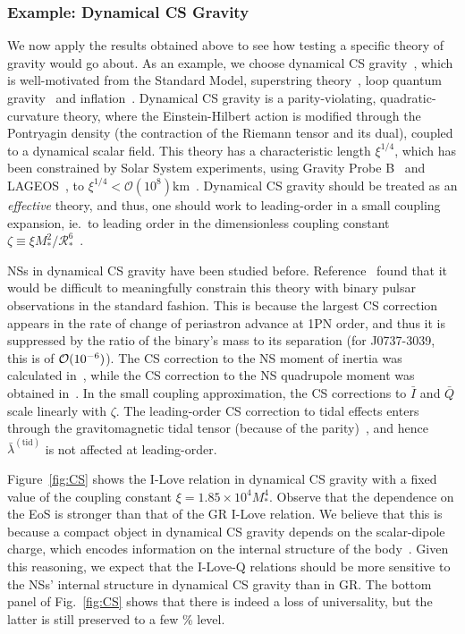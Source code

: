 \documentclass[aps,twocolumn,nofootinbib,showpacs,superscriptaddress,hyperref]{revtex4-1}
\newcommand{\NS}{*}
\newcommand{\RNS}{\mathcal{R}_*}
\newcommand{\tid}{\mathrm{(tid)}}
\newcommand{\Qbar}{\bar{Q}}
\begin{document}
\subsubsection{Example: Dynamical CS Gravity}

We now apply the results obtained above to see how testing a specific theory of gravity would go about. As an example, we choose dynamical CS gravity~\cite{jackiw,CSreview}, which is well-motivated from the Standard Model, superstring theory~\cite{polchinski1,polchinski2}, loop quantum gravity~\cite{alexandergates,taveras,calcagni} and inflation~\cite{weinberg-CS}. Dynamical CS gravity is a parity-violating, quadratic-curvature theory, where the Einstein-Hilbert action is modified through the Pontryagin density (the contraction of the Riemann tensor and its dual), coupled to a dynamical scalar field. This theory has a characteristic length $\xi^{1/4}$, which has been constrained by Solar System experiments, using Gravity Probe B~\cite{GPB} and LAGEOS~\cite{LAGEOS}, to $\xi^{1/4} < \mathcal{O}(10^8)$km~\cite{alihaimoud-chen}. Dynamical CS gravity should be treated as an {\emph{effective}} theory, and thus, one should work to leading-order in a small coupling expansion, ie.~to leading order in the dimensionless coupling constant $\zeta \equiv \xi M_\NS^2/\RNS^6$~\cite{kent-CSNS}.

NSs in dynamical CS gravity have been studied before. Reference~\cite{kent-CSNS} found that it would be difficult to meaningfully constrain this theory with binary pulsar observations in the standard fashion. This is because the largest CS correction appears in the rate of change of periastron advance at 1PN order, and thus it is suppressed by the ratio of the binary's mass to its separation (for J0737-3039, this is of ${\cal{O}}(10^{-6})$). The CS correction to the NS moment of inertia
was calculated in~\cite{yunespsaltis,alihaimoud-chen}, while the CS correction to the NS quadrupole moment was obtained in~\cite{kent-CSNS}. In the small coupling approximation, the CS corrections to $\bar{I}$ and $\Qbar$ scale linearly with $\zeta$. The leading-order CS correction to tidal effects enters through the gravitomagnetic tidal tensor (because of the parity)~\cite{quadratic}, and hence $\bar{\lambda}^\tid$ is not affected at leading-order.

Figure~\ref{fig:CS} shows the I-Love relation in dynamical CS gravity with a fixed value of the coupling constant $\xi = 1.85 \times 10^4 M_\NS^4$. Observe that the dependence on the EoS is stronger than that of the GR I-Love relation. We believe that this is because a compact object in dynamical CS gravity depends on the scalar-dipole charge, which encodes information on the internal structure of the body~\cite{kent-CSNS}. Given this reasoning, we expect that the I-Love-Q relations should be more sensitive to the NSs' internal structure in dynamical CS gravity than in GR. The bottom panel of Fig.~\ref{fig:CS} shows that there is indeed a loss of universality, but the latter is still preserved to a few \% level. 
\end{document}
